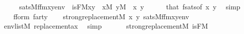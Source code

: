 \begin{isabellebody}
%
\isadelimproof
%
\endisadelimproof
%
\isatagproof
{}\isamarkupfalse%
\ {\isacharminus}{\kern0pt}\isanewline
\ \ \isamarkupfalse%
\ {\isachardoublequoteopen}sats{\isacharparenleft}{\kern0pt}M{\isacharcomma}{\kern0pt}f{\isacharunderscore}{\kern0pt}fm{\isacharcomma}{\kern0pt}{\isacharbrackleft}{\kern0pt}x{\isacharcomma}{\kern0pt}y{\isacharbrackright}{\kern0pt}{\isacharat}{\kern0pt}env{\isacharparenright}{\kern0pt}\ {\isasymlongleftrightarrow}\ is{\isacharunderscore}{\kern0pt}F{\isacharparenleft}{\kern0pt}{\isacharhash}{\kern0pt}{\isacharhash}{\kern0pt}M{\isacharcomma}{\kern0pt}x{\isacharcomma}{\kern0pt}y{\isacharparenright}{\kern0pt}{\isachardoublequoteclose}\ \ {\isachardoublequoteopen}x{\isasymin}M{\isachardoublequoteclose}\ {\isachardoublequoteopen}y{\isasymin}M{\isachardoublequoteclose}\ \ x\ y\isanewline
\ \ \ \ \isamarkupfalse%
\ that\ f{\isacharunderscore}{\kern0pt}sats{\isacharbrackleft}{\kern0pt}of\ x\ y{\isacharbrackright}{\kern0pt}\ \isamarkupfalse%
\ simp\isanewline
\ \ \isamarkupfalse%
\isanewline
\ \ \isamarkupfalse%
\ f{\isacharunderscore}{\kern0pt}form\ f{\isacharunderscore}{\kern0pt}arty\isanewline
\ \ \isamarkupfalse%
\ {\isachardoublequoteopen}strong{\isacharunderscore}{\kern0pt}replacement{\isacharparenleft}{\kern0pt}{\isacharhash}{\kern0pt}{\isacharhash}{\kern0pt}M{\isacharcomma}{\kern0pt}\ {\isasymlambda}x\ y{\isachardot}{\kern0pt}\ sats{\isacharparenleft}{\kern0pt}M{\isacharcomma}{\kern0pt}f{\isacharunderscore}{\kern0pt}fm{\isacharcomma}{\kern0pt}{\isacharbrackleft}{\kern0pt}x{\isacharcomma}{\kern0pt}y{\isacharbrackright}{\kern0pt}{\isacharat}{\kern0pt}env{\isacharparenright}{\kern0pt}{\isacharparenright}{\kern0pt}{\isachardoublequoteclose}\isanewline
\ \ \ \ \isamarkupfalse%
\ {\isacartoucheopen}env{\isasymin}list{\isacharparenleft}{\kern0pt}M{\isacharparenright}{\kern0pt}{\isacartoucheclose}\ replacement{\isacharunderscore}{\kern0pt}ax\ \isamarkupfalse%
\ simp\isanewline
\ \ \isamarkupfalse%
\isanewline
\ \ \isamarkupfalse%
\ {\isachardoublequoteopen}strong{\isacharunderscore}{\kern0pt}replacement{\isacharparenleft}{\kern0pt}{\isacharhash}{\kern0pt}{\isacharhash}{\kern0pt}M{\isacharcomma}{\kern0pt}\ is{\isacharunderscore}{\kern0pt}F{\isacharparenleft}{\kern0pt}{\isacharhash}{\kern0pt}{\isacharhash}{\kern0pt}M{\isacharparenright}{\kern0pt}{\isacharparenright}{\kern0pt}{\isachardoublequoteclose}\isanewline
\ \ \ \ \isamarkupfalse%

\end{isabellebody}
